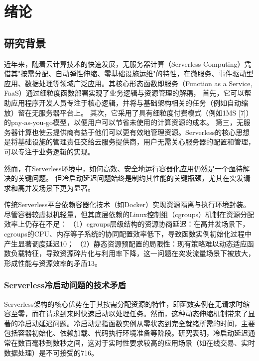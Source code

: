 \chapter{绪论}
\label{chap:intro}
\section{研究背景}

近年来，随着云计算技术的快速发展，无服务器计算（Serverless Computing）凭借其"按需分配、自动弹性伸缩、零基础设施运维"的特性，在微服务、事件驱动型应用、数据处理等领域广泛应用。其核心形态函数即服务（Function as a Service, FaaS）通过细粒度函数部署实现了业务逻辑与资源管理的解耦， 首先，它可以帮助应用程序开发人员专注于核心逻辑，并将与基础架构相关的任务（例如自动缩放）留在无服务器平台上。 其次，它采用了具有细粒度付费模式（例如1MS [7]）的pay-as-you-go模型，以便用户可以节省未使用的计算资源的成本。 第三，无服务器计算也使云提供商有益于他们可以更有效地管理资源。Serverless的核心思想是将基础设施的管理责任交给云服务提供商，用户无需关心服务器的配置和管理，可以专注于业务逻辑的实现。

然而，在Serverless环境中，如何高效、安全地运行容器化应用仍然是一个亟待解决的关键问题。
但冷启动延迟问题始终是制约其性能的关键瓶颈，尤其在突发请求和高并发场景下更为显著。

传统Serverless平台依赖容器化技术（如Docker）实现资源隔离与执行环境封装。尽管容器较虚拟机轻量，但其底层依赖的Linux控制组（cgroups）机制在资源分配效率上仍存在不足：
（1）cgroups层级结构的资源协商延迟：在高并发场景下，cgroups的CPU、内存等子系统的协同配置效率低下，导致函数实例初始化过程中产生显著调度延迟10；
（2）静态资源预配置的局限性：现有策略难以动态适应函数负载特征，导致资源碎片化与利用率下降，这一问题在突发流量场景下被放大，形成性能与资源效率的矛盾13。

\subsection{Serverless冷启动问题的技术矛盾} 
Serverless架构的核心优势在于其按需分配资源的特性，即函数实例在无请求时缩容至零，而在请求到来时快速启动以处理任务。然而，这种动态伸缩机制带来了显著的冷启动延迟问题。冷启动是指函数实例从零状态到完全就绪所需的时间，主要包括容器初始化、依赖加载、代码执行环境准备等阶段。研究表明，冷启动延迟通常在数百毫秒到数秒之间，这对于实时性要求较高的应用场景（如在线交易、实时数据处理）是不可接受的716。

